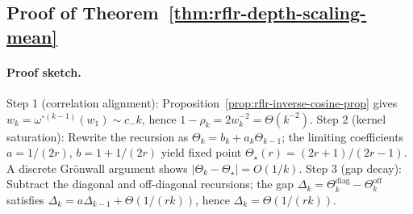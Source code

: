 \subsection{Proof of Theorem~\ref{thm:rflr-depth-scaling-mean}}\label{appendix:proof-rflr-depth-scaling-mean}

\paragraph{Proof sketch.} Step 1 (correlation alignment): Proposition~\ref{prop:rflr-inverse-cosine-prop} gives \(w_k=\omega^{\circ(k-1)}(w_1)\sim c_-k\), hence \(1-\rho_k=2w_k^{-2}=\Theta(k^{-2})\). Step 2 (kernel saturation): Rewrite the recursion as \(\Theta_k=b_k+a_k\Theta_{k-1}\); the limiting coefficients \(a=1/(2r)\), \(b=1+1/(2r)\) yield fixed point \(\Theta_\star(r)=(2r+1)/(2r-1)\). A discrete Grönwall argument shows \(|\Theta_k-\Theta_\star|=O(1/k)\). Step 3 (gap decay): Subtract the diagonal and off-diagonal recursions; the gap \(\Delta_k=\Theta^{\mathrm{diag}}_k-\Theta^{\mathrm{off}}_k\) satisfies \(\Delta_k=a\Delta_{k-1}+\Theta(1/(rk))\), hence \(\Delta_k=\Theta(1/(rk))\).
